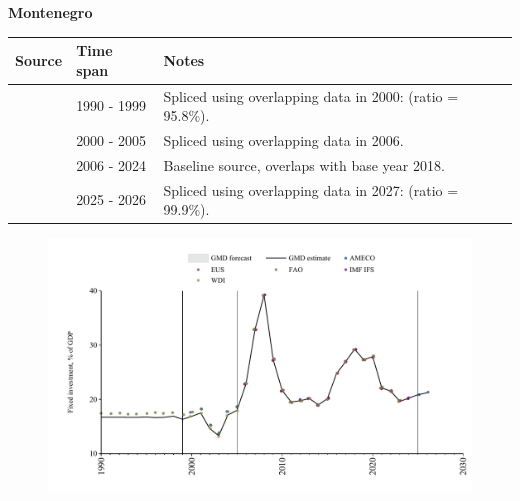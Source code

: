 \documentclass[12pt,a4paper,landscape]{article}
\begin{document}
\begin{adjustbox}{max totalsize={\paperwidth}{\paperheight},center}
\begin{minipage}[t][\textheight][t]{\textwidth}
\vspace*{0.5cm}
{}
\begin{center}
{\Large\bfseries Montenegro}
\end{center}
\vspace{0.5cm}
\begin{table}[H]
\centering
\small
\begin{tabular}{|l|l|l|}
\hline
\textbf{Source} & \textbf{Time span} & \textbf{Notes} \\
\hline
\rowcolor{white}\cite{FAO}& 1990 - 1999 &Spliced using overlapping data in 2000: (ratio = 95.8\%).\\
\rowcolor{lightgray}\cite{WDI}& 2000 - 2005 &Spliced using overlapping data in 2006.\\
\rowcolor{white}\cite{EUS}& 2006 - 2024 &Baseline source, overlaps with base year 2018.\\
\rowcolor{lightgray}\cite{AMECO}& 2025 - 2026 &Spliced using overlapping data in 2027: (ratio = 99.9\%).\\
\hline
\end{tabular}
\end{table}
\begin{figure}[H]
\centering
\includegraphics[width=\textwidth,height=0.6\textheight,keepaspectratio]{graphs/MNE_finv_GDP.pdf}
\end{figure}
\end{minipage}
\end{adjustbox}
\end{document}

